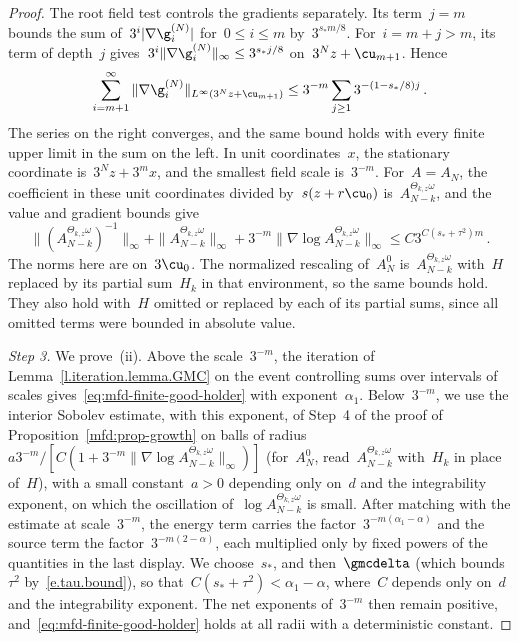 \documentclass[11pt]{amsart}
\begin{document}
\begin{proof}
\smallskip

The root field test controls the gradients separately. Its term~$j=m$ bounds the sum of~$3^i|\nabla\g_i^{(N)}|$ for~$0\leq i\leq m$ by~$3^{s_* m/8}$. For~$i=m+j>m$, its term of depth~$j$ gives~$3^i\|\nabla\g_i^{(N)}\|_\infty\leq3^{s_* j/8}$ on~$3^Nz+\cu_{m+1}$. Hence
\begin{equation*}
	\sum_{i=m+1}^{\infty}
	\|\nabla\g_i^{(N)}\|_{L^\infty(3^Nz+\cu_{m+1})}
	\leq3^{-m}\sum_{j\geq1}3^{-(1-s_*/8)j}\,.
\end{equation*}
The series on the right converges, and the same bound holds with every finite upper limit in the sum on the left. In unit coordinates~$x$, the stationary coordinate is~$3^Nz+3^mx$, and the smallest field scale is~$3^{-m}$. For~$A=A_N$, the coefficient in these unit coordinates divided by~$s(z+r\cu_0)$ is~$A_{N-k}^{\Theta_{k,z}\omega}$, and the value and gradient bounds give
\begin{equation*}
	\|(A_{N-k}^{\Theta_{k,z}\omega})^{-1}\|_\infty+\|A_{N-k}^{\Theta_{k,z}\omega}\|_\infty
	+3^{-m}\|\nabla\log A_{N-k}^{\Theta_{k,z}\omega}\|_\infty
	\leq C3^{C(s_*+\tau^2)m}\,.
\end{equation*}
The norms here are on~$3\cu_0$. The normalized rescaling of~$A_N^0$ is~$A_{N-k}^{\Theta_{k,z}\omega}$ with~$H$ replaced by its partial sum~$H_k$ in that environment, so the same bounds hold. They also hold with~$H$ omitted or replaced by each of its partial sums, since all omitted terms were bounded in absolute value.

\smallskip

\emph{Step 3.} We prove~(ii). Above the scale~$3^{-m}$, the iteration of Lemma~\ref{l.iteration.lemma.GMC} on the event controlling sums over intervals of scales gives~\eqref{eq:mfd-finite-good-holder} with exponent~$\alpha_1$. Below~$3^{-m}$, we use the interior Sobolev estimate, with this exponent, of Step~4 of the proof of Proposition~\ref{mfd:prop-growth} on balls of radius~$a3^{-m}/[C(1+3^{-m}\|\nabla\log A_{N-k}^{\Theta_{k,z}\omega}\|_\infty)]$ (for~$A_N^0$, read~$A_{N-k}^{\Theta_{k,z}\omega}$ with~$H_k$ in place of~$H$), with a small constant~$a>0$ depending only on~$d$ and the integrability exponent, on which the oscillation of~$\log A_{N-k}^{\Theta_{k,z}\omega}$ is small. After matching with the estimate at scale~$3^{-m}$, the energy term carries the factor~$3^{-m(\alpha_1-\alpha)}$ and the source term the factor~$3^{-m(2-\alpha)}$, each multiplied only by fixed powers of the quantities in the last display. We choose~$s_*$, and then~$\gmcdelta$ (which bounds~$\tau^2$ by~\eqref{e.tau.bound}), so that~$C(s_*+\tau^2)<\alpha_1-\alpha$, where~$C$ depends only on~$d$ and the integrability exponent. The net exponents of~$3^{-m}$ then remain positive, and~\eqref{eq:mfd-finite-good-holder} holds at all radii with a deterministic constant.


\end{proof}
\end{document}
